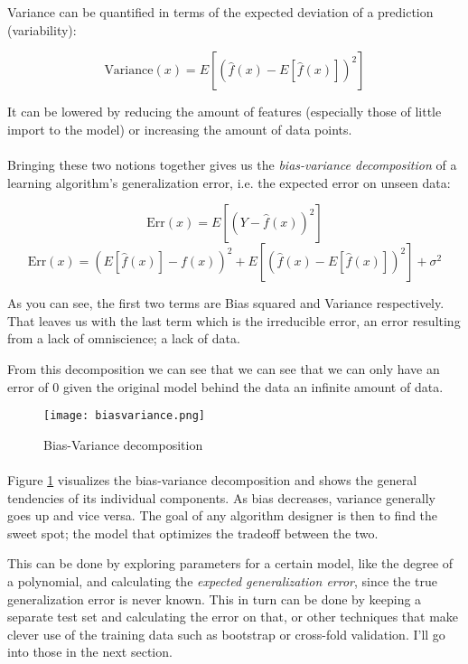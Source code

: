 Variance can be quantified in terms of
the expected deviation of a prediction (variability):

$$
\text{Variance}(x) = E[ (\hat{f}(x) - E[\hat{f}(x)])^2]
$$

It can be lowered by
reducing the amount of features
(especially those of little import to the model)
or increasing the amount of data points.

\paragraph{}
Bringing these two notions together
gives us the \textit{bias-variance decomposition}
of a learning algorithm's generalization error,
i.e. the expected error on unseen data:

$$
\text{Err}(x) = E[(Y - \hat{f}(x))^2]
$$
$$
\text{Err}(x) = (E[\hat{f} (x)] - f(x))^2 + E[ (\hat{f}(x) - E[\hat{f}(x)])^2] + \sigma^2
$$

As you can see, the first two terms
are Bias squared and Variance respectively.
That leaves us with the last term
which is the irreducible error,
an error resulting from a lack of
omniscience; a lack of data.

From this decomposition we can see that we
can see that we can only have an error of 0
given the original model behind the data
an infinite amount of data. %

\begin{figure}[ht]
\center
\texttt{[image: biasvariance.png]}

\caption{Bias-Variance decomposition}
\label{fig:biasvariance}
\end{figure}

\paragraph{}
Figure \ref{fig:biasvariance}
visualizes the bias-variance decomposition
and shows the general tendencies of its individual components.
As bias decreases, variance generally goes up
and vice versa.
The goal of any algorithm designer
is then to find the sweet spot;
the model that optimizes the tradeoff
between the two.

This can be done by exploring parameters
for a certain model,
like the degree of a polynomial,
and calculating the
\textit{expected generalization error}, %
since the true generalization error
is never known.
This in turn can be done
by keeping a separate test set
and calculating the error on that,
or other techniques that make clever use
of the training data
such as bootstrap or cross-fold validation.
I'll go into those in the next section. %

